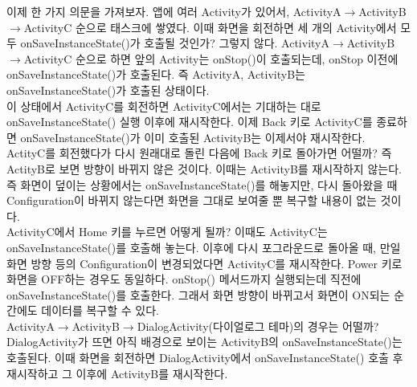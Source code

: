 이제 한 가지 의문을 가져보자.
앱에 여러 Activity가 있어서, ActivityA$\rightarrow$ActivityB$\rightarrow$ActivityC 순으로 태스크에 쌓였다. 이때 화면을 회전하면 세 개의 Activity에서 모두 onSaveInstanceState()가 호출될 것인가? 그렇지 않다.
ActivityA$\rightarrow$ActivityB$\rightarrow$ActivityC 순으로 하면 앞의 Activity는 onStop()이 호출되는데, onStop 이전에 onSaveInstanceState()가 호출된다.
즉 ActivityA, ActivityB는 onSaveInstanceState()가 호출된 상태이다.\\

이 상태에서 ActivityC를 회전하면 ActivityC에서는 기대하는 대로 onSaveInstanceState() 실행 이후에 재시작한다.
이제 Back 키로 ActivityC를 종료하면 onSaveInstanceState()가 이미 호출된 ActivityB는 이제서야 재시작한다.\\

ActityC를 회전했다가 다시 원래대로 돌린 다음에 Back 키로 돌아가면 어떨까? 즉 ActityB로 보면 방향이 바뀌지 않은 것이다.
이때는 ActivityB를 재시작하지 않는다. 즉 화면이 덮이는 상황에서는 onSaveInstanceState()를 해놓지만, 다시 돌아왔을 때 Configuration이 바뀌지 않는다면 화면을 그대로 보여줄 뿐 복구할 내용이 없는 것이다.\\

ActivityC에서 Home 키를 누르면 어떻게 될까? 이때도 ActivityC는 onSaveInstanceState()를 호출해 놓는다.
이후에 다시 포그라운드로 돌아올 때, 만일 화면 방향 등의 Configuration이 변경되었다면 ActivityC를 재시작한다. Power 키로 화면을 OFF하는 경우도 동일하다. onStop() 메서드까지 실행되는데 직전에 onSaveInstanceState()를 호출한다. 그래서 화면 방향이 바뀌고서 화면이 ON되는 순간에도 데이터를 복구할 수 있다.\\

ActivityA$\rightarrow$ActivityB$\rightarrow$DialogActivity(다이얼로그 테마)의 경우는 어떨까?
DialogActivity가 뜨면 아직 배경으로 보이는 ActivityB의 onSaveInstanceState()는 호출된다.
이때 화면을 회전하면 DialogActivity에서 onSaveInstanceState() 호출 후 재시작하고 그 이후에 ActivityB를 재시작한다.\\

